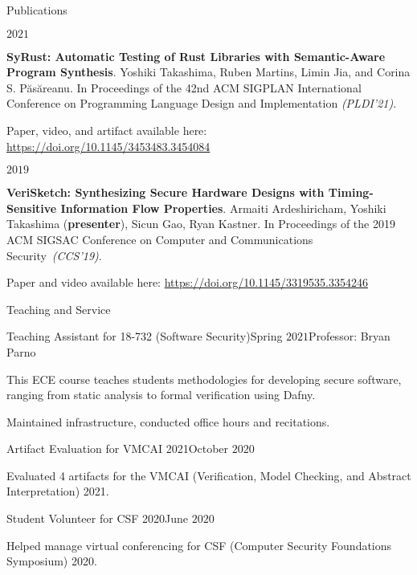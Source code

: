\documentclass{resume} %
\begin{document}
\begin{rSection}{Publications}

  \begin{rSubsection}{}{$2021$}{}{}
  \item \textbf{SyRust: Automatic Testing of Rust Libraries
    with Semantic-Aware Program Synthesis}.
    Yoshiki Takashima, Ruben Martins, Limin Jia, and Corina
    S. P\u{a}s\u{a}reanu.  In Proceedings of the 42nd
    ACM SIGPLAN International Conference on Programming Language
    Design and Implementation \textit{(PLDI’21)}.

    Paper, video, and artifact available here:
    \href{https://doi.org/10.1145/3453483.3454084}
    {https://doi.org/10.1145/3453483.3454084}
  \end{rSubsection}

  \begin{rSubsection}{}{$2019$}{}{}
  \item \textbf{VeriSketch: Synthesizing Secure Hardware Designs with
      Timing-Sensitive Information Flow Properties}.  Armaiti
    Ardeshiricham, Yoshiki Takashima (\textbf{presenter}), Sicun Gao,
    Ryan Kastner. In Proceedings of the 2019 ACM SIGSAC Conference on
    Computer and Communications Security~\textit{(CCS'19)}.

    Paper and video available here:
    \href{https://dl.acm.org/doi/abs/10.1145/3319535.3354246}
    {https://doi.org/10.1145/3319535.3354246}
  \end{rSubsection}
\end{rSection}

\begin{rSection}{Teaching and Service}

  \begin{rSubsection}{Teaching Assistant for 18-732 (Software
      Security)}{Spring $2021$}{Professor: Bryan Parno}{}
  \item This ECE course teaches students methodologies for developing secure
    software, ranging from static analysis to formal verification using Dafny.
  \item Maintained infrastructure, conducted office hours and recitations.
  \end{rSubsection}

  \begin{rSubsection}{Artifact Evaluation for VMCAI 2021}{October $2020$}
    {}{}
  \item Evaluated 4 artifacts for the VMCAI (Verification, Model
    Checking, and Abstract Interpretation) 2021.
  \end{rSubsection}

  \begin{rSubsection}{Student Volunteer for CSF 2020}{June $2020$}
    {}{}
  \item Helped manage virtual conferencing for CSF
    (Computer Security Foundations Symposium) 2020.
  \end{rSubsection}
\end{rSection}
\end{document}
